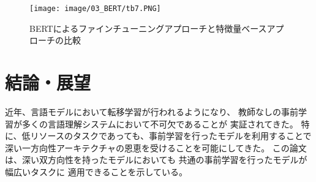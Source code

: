 \documentclass{jsarticle}
\begin{document}
\begin{figure}[H]
  \begin{center}
    \texttt{[image: image/03\_BERT/tb7.PNG]}
    \caption{BERTによるファインチューニングアプローチと特徴量ベースアプローチの比較}
    \label{fig:tb7}
  \end{center}
\end{figure}

\section{結論・展望}
近年、言語モデルにおいて転移学習が行われるようになり、
教師なしの事前学習が多くの言語理解システムにおいて不可欠であることが
実証されてきた。
特に、低リソースのタスクであっても、事前学習を行ったモデルを利用することで
深い一方向性アーキテクチャの恩恵を受けることを可能にしてきた。
この論文は、深い双方向性を持ったモデルにおいても
共通の事前学習を行ったモデルが幅広いタスクに
適用できることを示している。




\end{document}
